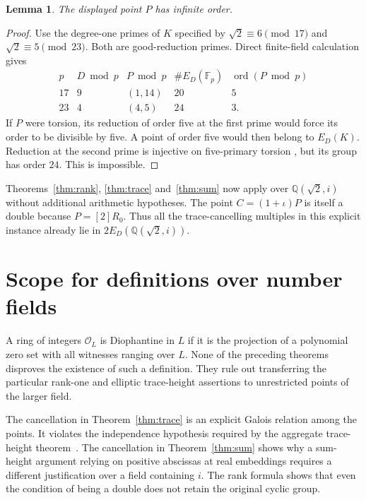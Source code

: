 \documentclass[11pt,a4paper]{article}
\newtheorem{lemma}[theorem]{Lemma}
\newcommand{\Q}{\mathbb Q}\newcommand{\Z}{\mathbb Z}
\begin{document}
\begin{lemma}\label{lem:nontorsion}
The displayed point $P$ has infinite order.
\end{lemma}
\begin{proof}
Use the degree-one primes of $K$ specified by
$\sqrt2\equiv6\pmod{17}$ and $\sqrt2\equiv5\pmod{23}$.
Both are good-reduction primes. Direct finite-field calculation gives
\[
\begin{array}{c|c|c|c|c}
 p&D\bmod p&P\bmod p&\#E_D(\mathbb F_p)&
                   \operatorname{ord}(P\bmod p)\\\hline
 17&9&(1,14)&20&5\\
 23&4&(4,5)&24&3.
\end{array}
\]
If $P$ were torsion, its reduction of order five at the first
prime would force its order to be divisible by five. A point of
order five would then belong to $E_D(K)$. Reduction at the second
prime is injective on five-primary torsion
\cite[Chapter VII, Section 3]{Silverman}, but its group has order
$24$. This is impossible.
\end{proof}

Theorems~\ref{thm:rank}, \ref{thm:trace} and~\ref{thm:sum} now
apply over $\Q(\sqrt2,i)$ without additional arithmetic hypotheses.
The point $C=(1+\iota)P$ is itself a double because $P=[2]R_0$.
Thus all the trace-cancelling multiples in this explicit instance
already lie in $2E_D(\Q(\sqrt2,i))$.

\section{Scope for definitions over number fields}

A ring of integers $\mathcal O_L$ is Diophantine in $L$ if it
is the projection of a polynomial zero set with all witnesses
ranging over $L$. None of the preceding theorems disproves the
existence of such a definition. They rule out transferring the
particular rank-one and elliptic trace-height assertions to
unrestricted points of the larger field.

The cancellation in Theorem~\ref{thm:trace} is an explicit Galois
relation among the points. It violates the independence hypothesis
required by the aggregate trace-height theorem~\cite{Aggregate}. The cancellation
in Theorem~\ref{thm:sum} shows why a sum-height argument relying
on positive abscissas at real embeddings requires a different
justification over a field containing $i$.
The rank formula shows that even the condition of being a double
does not retain the original cyclic group.
\end{document}
